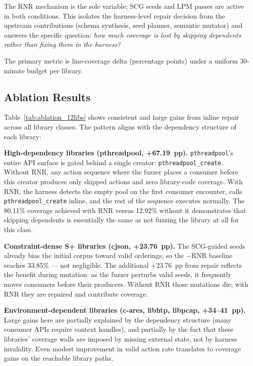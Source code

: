 The RNR mechanism is the sole variable; SCG seeds and LPM passes are
active in both conditions.  This isolates the harness-level repair
decision from the upstream contributions (schema synthesis, seed
planner, semantic mutator) and answers the specific question: \emph{how
much coverage is lost by skipping dependents rather than fixing them
in the harness?}

The primary metric is line-coverage delta (percentage points) under a
uniform 30-minute budget per library.

\subsection{Ablation Results}
\label{sec:eval_rnr_evidence}



Table~\ref{tab:ablation_12libs} shows consistent and large gains from
inline repair across all library classes.  The pattern aligns with the
dependency structure of each library:

\textbf{High-dependency libraries (pthreadpool, +67.19~pp).}
\texttt{pthreadpool}'s entire API surface is gated behind a single
creator: \texttt{pthreadpool\_create}.  Without RNR, any action sequence
where the fuzzer places a consumer before this creator produces only
skipped actions and zero library-code coverage.  With RNR, the harness
detects the empty pool on the first consumer encounter, calls
\texttt{pthreadpool\_create} inline, and the rest of the sequence
executes normally.  The 80.11\% coverage achieved with RNR versus 12.92\%
without it demonstrates that skipping dependents is essentially the same
as not fuzzing the library at all for this class.

\textbf{Constraint-dense S+ libraries (cjson, +23.76~pp).}
The SCG-guided seeds already bias the initial corpus toward valid
orderings, so the $-$RNR baseline reaches 33.85\% — not negligible.
The additional +23.76~pp from repair reflects the benefit during
mutation: as the fuzzer perturbs valid seeds, it frequently moves
consumers before their producers.  Without RNR those mutations die;
with RNR they are repaired and contribute coverage.

\textbf{Environment-dependent libraries (c-ares, libhtp, libpcap, +34--41~pp).}
Large gains here are partially explained by the dependency structure
(many consumer APIs require context handles), and partially by the fact
that these libraries' coverage walls are imposed by missing external
state, not by harness invalidity.  Even modest improvement in valid
action rate translates to coverage gains on the reachable library paths.

